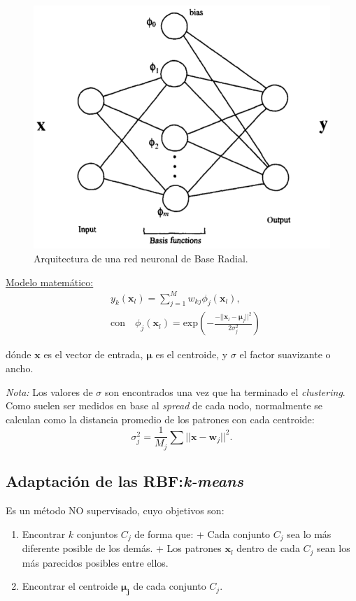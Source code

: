 \documentclass[10pt,a4paper]{article}
\begin{document}
\begin{figure}
  \label{fig:radial}
  \caption{Arquitectura de una red neuronal de Base Radial.}
  \centering
  \hbox{\includegraphics[width=0.5\textwidth-\fboxrule-\fboxrule]{radial.png}}  
\end{figure}	

\underline{Modelo matemático:}
\begin{align*}
&y_k (\mathbf{x}_l) = \sum_{j=1}^M w_{kj} \phi_j (\mathbf{x}_l), 
\\ &\text{con} \quad \phi_j (\mathbf{x}_l) = \text{exp}\left({-\frac{-||\mathbf{x}_l - \mathbf{\mu}_j||^2}{2 \sigma_j^2}}\right)
\end{align*}

dónde $\mathbf{x}$ es el vector de entrada, $\mathbf{\mu}$ es el centroide, y $\sigma$ el factor suavizante o ancho.

\textit{Nota:} Los valores de $\sigma$ son encontrados una vez que ha terminado el \textit{clustering}. Como suelen ser medidos en base al \textit{spread} de cada nodo, normalmente se calculan como la distancia promedio de los patrones con cada centroide:
\[\sigma_j^2 = \frac{1}{M_j} \sum ||\mathbf{x} - \mathbf{w}_j||^2.\]

\subsection{Adaptación de las RBF:\textit{k-means}}
Es un método NO supervisado, cuyo objetivos son:
\begin{enumerate}
\item Encontrar $k$ conjuntos $C_j$ de forma que:
\subitem + Cada conjunto $C_j$ sea lo más diferente posible de los demás.
\subitem + Los patrones $\mathbf{x}_l$ dentro de cada $C_j$ sean los más parecidos posibles entre ellos.
\item Encontrar el centroide $\mathbf{\mu_j}$ de cada conjunto $C_j$.
\end{enumerate}
\end{document}
